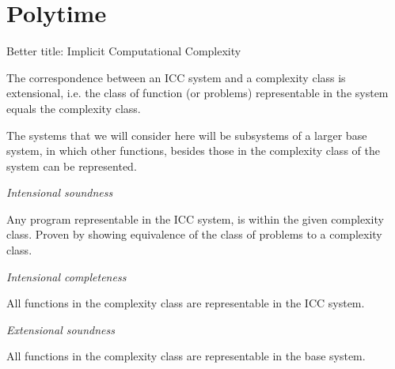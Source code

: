 \chapter{Polytime}

Better title: Implicit Computational Complexity




The correspondence between an ICC system and a complexity class is extensional,
i.e. the class of function (or problems) representable in the system equals the
complexity class.


The systems that we will consider here will be subsystems of a larger base
system, in which other functions, besides those in the complexity class of the
system can be represented.

\begin{definition} \textit{Intensional soundness}

Any program representable in the ICC system, is within the given complexity
class. Proven by showing equivalence of the class of problems to a complexity
class.

\end{definition}

\begin{definition} \textit{Intensional completeness}

All functions in the complexity class are representable in the ICC system.

\end{definition}

\begin{definition} \textit{Extensional soundness}

All functions in the complexity class are representable in the base system.

\end{definition}


